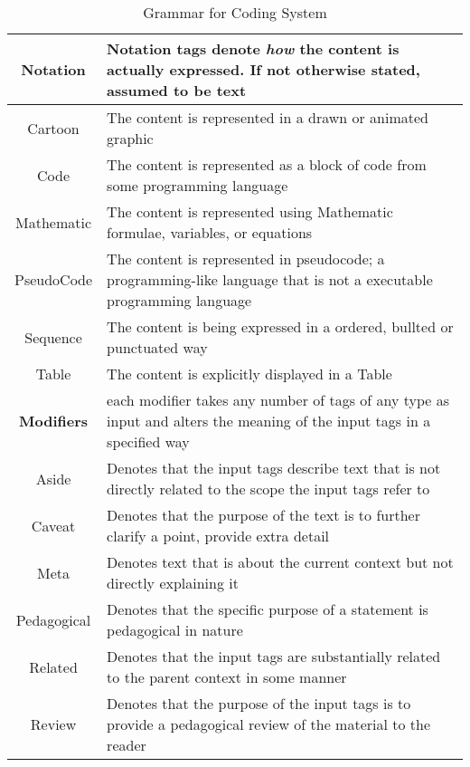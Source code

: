 \begin{table}[h!]
\begin{tabular}{c p{1.8\linewidth}}
    
    \textbf{Notation} & Notation tags denote \emph{how }the content is actually expressed. If not otherwise stated, assumed to be text \\
    \hline
    Cartoon & The content is represented in a drawn or animated graphic\\
    Code & The content is represented as a block of code from some programming language\\
    Mathematic & The content is represented using Mathematic formulae, variables, or equations\\
    PseudoCode & The content is represented in pseudocode; a programming-like language that is not a executable programming language\\
    Sequence & The content is being expressed in a ordered, bullted or punctuated way\\
    Table & The content is explicitly displayed in a Table\\


    \textbf{Modifiers} & each modifier takes any number of tags of any type as input and alters the meaning of the input tags in a specified way \\
    \hline
    Aside & Denotes that the input tags describe text that is not directly related to the scope the input tags refer to \\
    Caveat & Denotes that the purpose of the text is to further clarify a point, provide extra detail\\
    Meta & Denotes text that is about the current context but not directly explaining it\\
    Pedagogical & Denotes that the specific purpose of a statement is pedagogical in nature\\
    Related & Denotes that the input tags are substantially related to the parent context in some manner\\
    Review & Denotes that the purpose of the input tags is to provide a pedagogical review of the material to the reader\\
  \end{tabular}
  \caption{Grammar for Coding System}
  \label{res:tbl:grmr}
\end{table}

